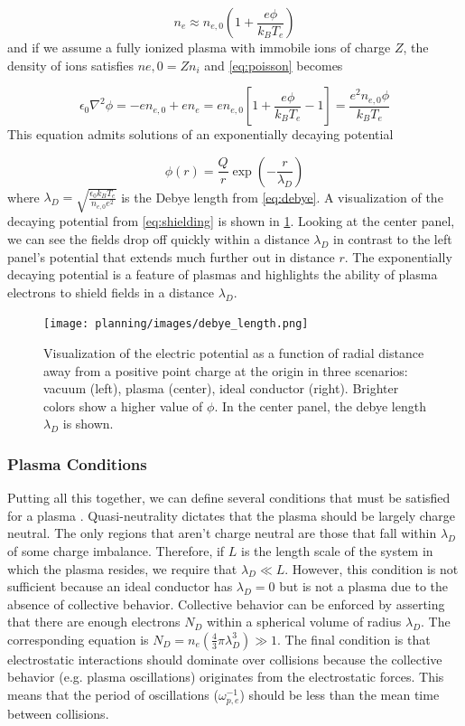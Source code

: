 \begin{equation}
	n_e \approx n_{e,0}(1 + \frac{e \phi}{k_B T_e})
\end{equation} 
and if we assume a fully ionized plasma with immobile ions of charge $Z$, the density of ions satisfies $n{e,0} = Z n_i$ and \cref{eq:poisson} becomes 

\begin{equation}
	\epsilon_0 \nabla^2 \phi = - e n_{e,0} + e n_e = e n_{e,0} [1 + \frac{e \phi}{k_B T_e} - 1] = \frac{e^2 n_{e,0} \phi}{k_B T_e}
\end{equation}
This equation admits solutions of an exponentially decaying potential

\begin{equation}
	\phi(r) = \frac{Q}{r} \exp(-\frac{r}{\lambda_{D}}) \label{eq:shielding}
\end{equation}
where $\lambda_D = \sqrt{\frac{\epsilon_0 k_B T_e}{n_{e,0} e^2}}$ is the Debye length from \cref{eq:debye}. A visualization of the decaying potential from \cref{eq:shielding} is shown in \cref{fig:debye}. Looking at the center panel, we can see the fields drop off quickly within a distance $\lambda_D$ in contrast to the left panel's potential that extends much further out in distance $r$. The exponentially decaying potential is a feature of plasmas and highlights the ability of plasma electrons to shield fields in a distance $\lambda_D$. 

\begin{figure}
	\centering 
	\texttt{[image: planning/images/debye\_length.png]}
	\caption{Visualization of the electric potential as a function of radial distance away from a positive point charge at the origin in three scenarios: vacuum (left), plasma (center), ideal conductor (right). Brighter colors show a higher value of $\phi$. In the center panel, the debye length $\lambda_D$ is shown.}
	\label{fig:debye}
\end{figure}

\subsubsection{Plasma Conditions}
Putting all this together, we can define several conditions that must be satisfied for a plasma \cite{Chen_2015_Plasma}. Quasi-neutrality dictates that the plasma should be largely charge neutral. The only regions that aren't charge neutral are those that fall within $\lambda_D$ of some charge imbalance. Therefore, if $L$ is the length scale of the system in which the plasma resides, we require that $\lambda_D \ll L$. However, this condition is not sufficient because an ideal conductor has $\lambda_D = 0$ but is not a plasma due to the absence of collective behavior. Collective behavior can be enforced by asserting that there are enough electrons $N_D$ within a spherical volume of radius $\lambda_D$. The corresponding equation is $N_D = n_e (\frac{4}{3} \pi \lambda_D^3) \gg 1$. The final condition is that electrostatic interactions should dominate over collisions because the collective behavior (e.g. plasma oscillations) originates from the electrostatic forces. This means that the period of oscillations ($\omega_{p,e}^{-1}$) should be less than the mean time between collisions. 

